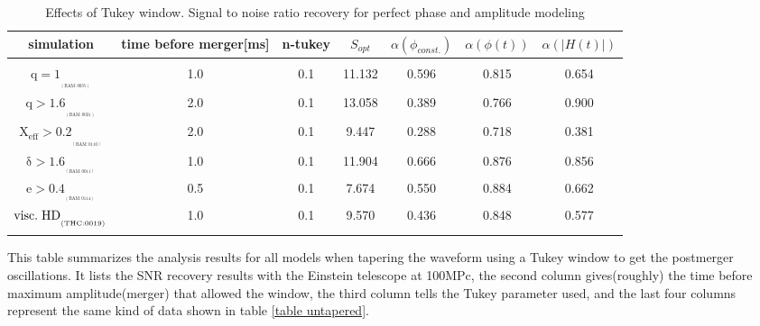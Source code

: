 \begin{table}[!htbp]
\begin{center}

\begin{tabular}{ccccccc}
simulation&time before merger[ms]&n-tukey&$S_{opt}$&$\alpha(\phi_{const.})$&$\alpha(\phi(t))$&$\alpha(|H(t)|)$\\ 
\hline\\ 
$\mathrm{{q=1}_{_{_{(BAM:0035)}}}}$&1.0&0.1&11.132&0.596&0.815&0.654\\  
$\mathrm{{q>1.6}_{_{_{(BAM:0021)}}}}$&2.0&0.1&13.058&0.389&0.766&0.900\\  
$\mathrm{{X_{eff}>0.2}_{_{_{(BAM:0110)}}}}$&2.0&0.1&9.447&0.288&0.718&0.381\\  
$\mathrm{{\delta>1.6}_{_{_{(BAM:0011)}}}}$&1.0&0.1&11.904&0.666&0.876&0.856\\  
$\mathrm{{e>0.4}_{_{_{(BAM:0114)}}}}$&0.5&0.1&7.674&0.550&0.884&0.662\\  
$\mathrm{{visc.\hspace{1mm} HD}_{_{_{(THC:0019)}}}}$&1.0&0.1&9.570&0.436&0.848&0.577\\  
\hline\\ 
\end{tabular}

\end{center}
\caption{Effects of Tukey window. Signal to noise ratio recovery for perfect phase and amplitude modeling}
This table summarizes the analysis results for all models when tapering the waveform using a Tukey window to get the postmerger oscillations. It lists the  SNR  recovery results with the Einstein telescope at 100MPc, the second column gives(roughly) the time before maximum amplitude(merger) that allowed the window,  the third column tells the Tukey parameter used, and the last four columns represent the same kind of data shown in table \ref{table untapered}.
\end{table}
\FloatBarrier

